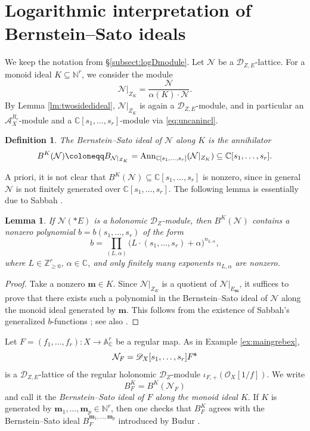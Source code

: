 \documentclass{amsart}
\theoremstyle{plain}
\numberwithin{theorem}{section}
\newtheorem{lemma}[theorem]{Lemma}
\newtheorem{definition}[theorem]{Definition}
\theoremstyle{definition}
\theoremstyle{remark}
\theoremstyle{definition}
\newcommand{\A}{\mathbb{A}}
\newcommand{\C}{\mathbb{C}} %
\newcommand{\N}{\mathbb{N}}
\newcommand{\Z}{\mathbb{Z}}
\newcommand{\cN}{\mathcal{N}}
\newcommand{\cO}{\mathscr{O}}
\newcommand{\bm}{\mathbf{m}}
\newcommand{\sA}{\mathscr{A}}
\newcommand{\shD}{\mathscr{D}}
\newcommand{\bs}{{\bf s}}
\newcommand{\Ann}{{\textup{Ann}}}
\begin{document}
\section{Logarithmic interpretation of Bernstein--Sato ideals}
\label{subsect:logBSideal}

We keep the notation from \S\ref{subsect:logDmodule}. Let $\cN$ be a
$\shD_{Z,E}$-lattice. For a monoid ideal $K\subseteq \N^r$, we consider the
module
\[
\cN|_{Z_K}
=
\frac{\cN}{\alpha(K)\cdot \cN}.
\]
By Lemma \ref{lm:twosidedideal}, $\cN|_{Z_K}$ is again a
$\shD_{Z,E}$-module, and in particular an $\sA_X^{R_r}$-module and a
$\C[s_1,\dots,s_r]$-module via \eqref{eq:uncanincl}.

\begin{definition}
The \emph{Bernstein--Sato ideal} of $\cN$ along $K$ is the annihilator
\[
B^K(\cN)
\coloneqq
B_{\cN|_{Z_K}}
=
\Ann_{\C[s_1,\dots,s_r]}(\cN|_{Z_K})
\subseteq
\C[s_1,\dots,s_r].
\]
\end{definition}

A priori, it is not clear that
$B^K(\cN)\subseteq \C[s_1,\dots,s_r]$
is nonzero, since in general $\cN$ is not finitely generated over
$\C[s_1,\dots,s_r]$. The following lemma is essentially due to Sabbah
\cite{Sab}.

\begin{lemma}\label{lm:subbahgb}
If $\cN(*E)$ is a holonomic $\shD_Z$-module, then $B^K(\cN)$ contains a
nonzero polynomial $b=b(s_1,\dots,s_r)$ of the form
\[
b
=
\prod_{(L,\alpha)}
\big(L\cdot(s_1,\dots,s_r)+\alpha\big)^{n_{L,\alpha}},
\]
where $L\in \Z_{\ge 0}^r$, $\alpha\in \C$, and only finitely many exponents
$n_{L,\alpha}$ are nonzero.
\end{lemma}

\begin{proof}
Take a nonzero $\bm\in K$. Since $\cN|_{Z_K}$ is a quotient of
$\cN|_{E_\bm}$, it suffices to prove that there exists such a polynomial in
the Bernstein--Sato ideal of $\cN$ along the monoid ideal generated by $\bm$.
This follows from the existence of Sabbah's generalized $b$-functions
\cite[\S 3]{Sab}; see also \cite[Thm.4.23]{Wuch}.
\end{proof}

Let
$F=(f_1,\dots,f_r)\colon X\to \A_\C^r$
be a regular map. As in Example \ref{ex:maingrebex},
\[
\cN_F
=
\shD_X[s_1,\dots,s_r]F^\bs
\]
is a $\shD_{Z,E}$-lattice of the regular holonomic $\shD_Z$-module
$\iota_{F,+}(\cO_X[1/f])$.
We write
\[
B_F^K=B^K(\cN_F)
\]
and call it the \emph{Bernstein--Sato ideal of $F$ along the monoid ideal
$K$}. If $K$ is generated by
$\bm_1,\dots,\bm_p\in \N^r$,
then one checks that $B_F^K$ agrees with the Bernstein--Sato ideal
$B_F^{\bm_1,\dots,\bm_p}$ introduced by Budur \cite[Def.4.2]{Budur}.
\end{document}

